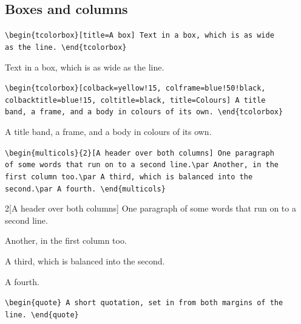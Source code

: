 \documentclass[9pt]{extarticle}
\begin{document}
\newpage
\subsection*{Boxes and columns}

{\small\verb|\begin{tcolorbox}[title=A box] Text in a box, which is as wide| \\ \verb|as the line. \end{tcolorbox}|}

\begin{tcolorbox}[title=A box] Text in a box, which is as wide as the line. \end{tcolorbox}

{\small\verb|\begin{tcolorbox}[colback=yellow!15, colframe=blue!50!black,| \\ \verb|colbacktitle=blue!15, coltitle=black, title=Colours] A title| \\ \verb|band, a frame, and a body in colours of its own. \end{tcolorbox}|}

\begin{tcolorbox}[colback=yellow!15, colframe=blue!50!black, colbacktitle=blue!15, coltitle=black, title=Colours] A title band, a frame, and a body in colours of its own. \end{tcolorbox}

{\small\verb|\begin{multicols}{2}[A header over both columns] One paragraph| \\ \verb|of some words that run on to a second line.\par Another, in the| \\ \verb|first column too.\par A third, which is balanced into the| \\ \verb|second.\par A fourth. \end{multicols}|}

\begin{multicols}{2}[A header over both columns] One paragraph of some words that run on to a second line.\par Another, in the first column too.\par A third, which is balanced into the second.\par A fourth. \end{multicols}

{\small\verb|\begin{quote} A short quotation, set in from both margins of the| \\ \verb|line. \end{quote}|}
\end{document}
